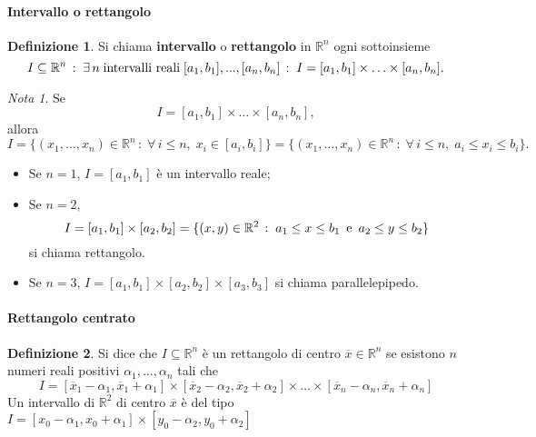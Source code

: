\documentclass{article}
\theoremstyle{plain}
\theoremstyle{definition}
\newtheorem{defn}{Definizione}[section]
\theoremstyle{remark}
\newtheorem{note}{Nota}
\begin{document}
\vspace{10pt}

\paragraph{Intervallo o rettangolo}
\begin{bxthm}
\begin{defn}
    Si chiama \textbf{intervallo} o \textbf{rettangolo} in $\mathbb{R}^n$ ogni sottoinsieme
    \[I\subseteq\mathbb{R}^n\,:\;\exists\, n\; \textup{intervalli reali}\; [a_1,b_1],...,[a_n,b_n]\,:\;I=[a_1,b_1]\times\ldots\times[a_n,b_n].\]
\end{defn}
\end{bxthm}

\vspace{10pt}

\begin{note}
    Se 
    \[I=[a_1,b_1]\times\ldots\times[a_n,b_n],\] 
    allora 
    \[I=\{(x_1,\ldots,x_n)\in\mathbb{R}^n\,:\;\forall\, i\leq n,\; x_i\in[a_i,b_i]\}=\{(x_1,\ldots,x_n)\in\mathbb{R}^n\,:\;\forall\, i\leq n,\; a_i\leq x_i\leq b_i\}.\]    
\begin{itemize}
    \item Se $n=1$, $I=[a_1,b_1]$ è un intervallo reale;
    \item Se $n=2$, 
    \[I=[a_1,b_1]\times[a_2,b_2]=\{(x,y)\in\mathbb{R}^2\,:\;a_1\leq x\leq b_1\,\textup{ e }\,a_2\leq y\leq b_2\}\]
    si chiama rettangolo.
    \item Se $n=3$, \(I=[a_1,b_1]\times[a_2,b_2]\times[a_3,b_3]\) si chiama parallelepipedo.
\end{itemize}
\end{note}

\vspace{10pt}

\paragraph{Rettangolo centrato}
\begin{bxthm}
\begin{defn}
    Si dice che $I\subseteq\mathbb{R}^n$ è un rettangolo di centro $\overline{x}\in\mathbb{R}^n$ se esistono $n$ numeri reali positivi $\alpha_1,\ldots,\alpha_n$ tali che
    \[I=[\overline{x}_1-\alpha_1,\overline{x}_1+\alpha_1]\times [\overline{x}_2-\alpha_2,\overline{x}_2+\alpha_2]\times\ldots\times [\overline{x}_n-\alpha_n,\overline{x}_n+\alpha_n]\]
    Un intervallo di $\mathbb{R}^2$ di centro $\overline{x}$ è del tipo $I=[x_0-\alpha_1,x_0+\alpha_1]\times[y_0-\alpha_2,y_0+\alpha_2]$
\end{defn}
\end{bxthm}
\end{document}
